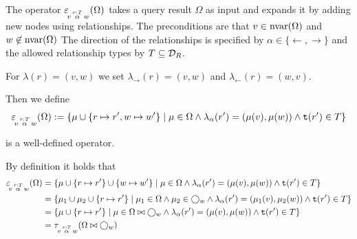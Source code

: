 \begin{definition}
\label{def:expand}

The  operator $\varepsilon\!_{v\, \overset{r:T}{\alpha} \, w}(\Omega)$ takes a query
result $\Omega$ as input and expands it by adding new nodes using
relationships. The preconditions are that
$v \in \textnormal{nvar}(\Omega)$
and
$w \not \in \textnormal{nvar}(\Omega)$
The direction of the relationships is specified by
$\alpha \in \{\leftarrow, \rightarrow\}$
and the allowed relationship types by
$T \subseteq \mathcal{D}_R$.

For $\lambda(r) = (v, w)$ we set $\lambda_\rightarrow(r) = (v, w)$ and
$\lambda_\leftarrow(r) = (w, v)$.

Then we define
\[
  \varepsilon\!_{v\, \overset{r:T}{\alpha} \, w}(\Omega) := \{ \mu \cup \{ r \mapsto r', w \mapsto w' \} \mid
                                              \mu \in \Omega \land \lambda_\alpha(r') = (\mu(v), \mu(w))
                                              \land \texttt{t}(r') \in T \}
\]

\begin{proofof}{ is a well-defined operator.}
\label{proof:expand-well-defined}

By definition it holds that
\begin{align}
\begin{split}
  \varepsilon\!_{v\, \overset{r:T}{\alpha} \, w}(\Omega) &= \{ \mu \cup \{ r \mapsto r' \} \cup \{ w \mapsto w' \} \mid
                                              \mu \in \Omega \land \lambda_\alpha(r') = (\mu(v), \mu(w))
                                              \land \texttt{t}(r') \in T \} \\
                                        &= \{ \mu_1 \cup \mu_2 \cup \{ r \mapsto r' \} \mid
                                              \mu_1 \in \Omega \land \mu_2 \in \bigcirc_{w} \land \lambda_\alpha(r') = (\mu_1(v), \mu_2(w))
                                              \land \texttt{t}(r') \in T \} \\
                                        &= \{ \mu \cup \{ r \mapsto r' \} \mid
                                              \mu \in \Omega \bowtie \bigcirc_{w} \land \lambda_\alpha(r') = (\mu(v), \mu(w))
                                              \land \texttt{t}(r') \in T \} \\
                                        &= \tau\!_{v\, \overset{r:T}{\alpha} \, w}(\Omega \bowtie \bigcirc_{w}) \label{eq:expand}
\end{split}
\end{align}


\end{proofof}
\end{definition}
